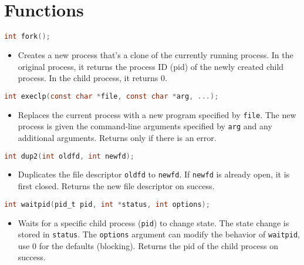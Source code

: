 \documentclass[twoside]{article}
\begin{document}
\section{Functions}
\begin{summary}
\begin{lstlisting}[language=C]
int fork();
\end{lstlisting}
    \begin{itemize}
        \item Creates a new process that's a clone of the currently running process. In the original process, it returns the process ID (pid) of the newly created child process. In the child process, it returns 0.
    \end{itemize}
    
\begin{lstlisting}[language=C]
int execlp(const char *file, const char *arg, ...);
\end{lstlisting}
    \begin{itemize}
        \item Replaces the current process with a new program specified by \texttt{file}. The new process is given the command-line arguments specified by \texttt{arg} and any additional arguments. Returns only if there is an error.
    \end{itemize}
    
\begin{lstlisting}[language=C]
int dup2(int oldfd, int newfd);
\end{lstlisting}
    \begin{itemize}
        \item Duplicates the file descriptor \texttt{oldfd} to \texttt{newfd}. If \texttt{newfd} is already open, it is first closed. Returns the new file descriptor on success.
    \end{itemize}
    
\begin{lstlisting}[language=C]
int waitpid(pid_t pid, int *status, int options);
\end{lstlisting}
    \begin{itemize}
        \item Waits for a specific child process (\texttt{pid}) to change state. The state change is stored in \texttt{status}. The \texttt{options} argument can modify the behavior of \texttt{waitpid}, use 0 for the defaults (blocking). Returns the pid of the child process on success.
    \end{itemize}
    

\end{summary}
\end{document}
